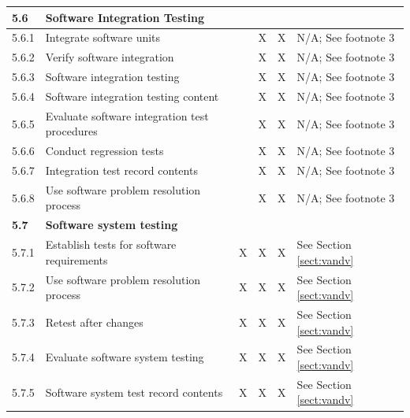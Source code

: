 \documentclass[]{article}
\begin{document}
\begin{center}
\begin{longtable}{ |p{1.3cm}| p{5.5cm}| p{0.7cm}| p{0.7cm}| p{0.7cm}| p{3.5cm}| }
	
	\rowcolor{blue!25} \textbf{5.6} & \textbf{Software Integration Testing}  &  &  &  &  \\ \hline
	5.6.1 & Integrate software units  &  & X & X & N/A; See footnote 3 \\ \hline
	5.6.2 & Verify software integration  &  & X & X & N/A; See footnote 3 \\ \hline
	5.6.3 & Software integration testing &  & X & X & N/A; See footnote 3 \\ \hline
	5.6.4 & Software integration testing content &  & X & X & N/A; See footnote 3 \\ \hline
	5.6.5 & Evaluate software integration test procedures &  & X & X & N/A; See footnote 3 \\ \hline
	5.6.6 & Conduct regression tests &  & X & X &N/A; See footnote 3  \\ \hline
	5.6.7 & Integration test record contents  &  & X & X &N/A; See footnote 3  \\ \hline
	5.6.8 & Use software problem resolution process &  & X & X &N/A; See footnote 3  \\ \hline
	
	
	\rowcolor{blue!25} \textbf{5.7} & \textbf{Software system testing} &  &  &  &  \\ \hline
	5.7.1 & Establish tests for software requirements  & X & X & X & See Section \ref{sect:vandv} \\ \hline
	5.7.2 & Use software problem resolution process  & X & X & X & See Section \ref{sect:vandv} \\ \hline
	5.7.3 & Retest after changes  & X & X & X & See Section \ref{sect:vandv} \\ \hline
	5.7.4 & Evaluate software system testing & X & X & X & See Section \ref{sect:vandv} \\ \hline
	5.7.5 & Software system test record contents  & X & X & X & See Section \ref{sect:vandv} \\ \hline
	

\end{longtable}
\end{center}
\end{document}

